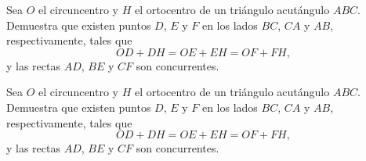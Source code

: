 \documentclass[11pt]{scrartcl}
\begin{document}
\begin{problem} %
    Sea $O$ el circuncentro y $H$ el ortocentro de un triángulo acutángulo $ABC$.  Demuestra que existen puntos $D$, $E$ y $F$ en los lados $BC$, $CA$ y $AB$, respectivamente, tales que
\[
OD + DH = OE + EH = OF + FH,
\]
y las rectas $AD$, $BE$ y $CF$ son concurrentes.
\end{problem}

\begin{problem} %
Sea $O$ el circuncentro y $H$ el ortocentro de un triángulo acutángulo $ABC$. Demuestra que existen puntos $D$, $E$ y $F$ en los lados $BC$, $CA$ y $AB$, respectivamente, tales que
\[
OD + DH = OE + EH = OF + FH,
\]
y las rectas $AD$, $BE$ y $CF$ son concurrentes.
\end{problem}
\end{document}
